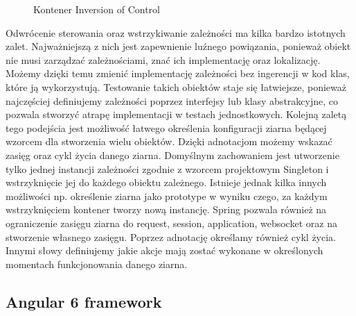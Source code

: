 	\begin{figure}[h!]
		\caption{Kontener Inversion of Control}
		\centering
		\label{fig:inversionOfControl}
	\end{figure}


Odwrócenie sterowania oraz wstrzykiwanie zależności ma kilka bardzo istotnych zalet. Najważniejszą z nich jest zapewnienie luźnego powiązania, ponieważ obiekt nie musi zarządzać zależnościami, znać ich implementację oraz lokalizację. Możemy dzięki temu zmienić implementację zależności bez ingerencji w kod klas, które ją wykorzystują. Testowanie takich obiektów staje się łatwiejsze, ponieważ najczęściej definiujemy zależności poprzez interfejsy lub klasy abstrakcyjne, co pozwala stworzyć atrapę implementacji w testach jednostkowych. Kolejną zaletą tego podejścia jest możliwość łatwego określenia konfiguracji ziarna będącej wzorcem dla stworzenia wielu obiektów. Dzięki adnotacjom możemy wskazać zasięg oraz cykl życia danego ziarna. Domyślnym zachowaniem jest utworzenie tylko jednej instancji zależności zgodnie z wzorcem projektowym Singleton i wstrzyknięcie jej do każdego obiektu zależnego. Istnieje jednak kilka innych możliwości np. określenie ziarna jako prototype w wyniku czego, za każdym wstrzyknięciem kontener tworzy nową instancję. Spring pozwala również na ograniczenie zasięgu ziarna do request, session, application, websocket oraz na stworzenie własnego zasięgu. Poprzez adnotację określamy również cykl życia. Innymi słowy definiujemy jakie akcje mają zostać wykonane w określonych momentach funkcjonowania danego ziarna.





\subsection{Angular 6 framework}
\label{subsec:angularFramework}

